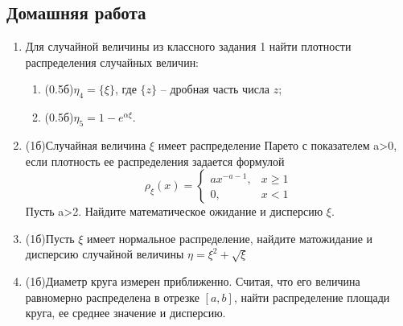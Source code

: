 \documentclass[a4paper, 14pt]{extarticle}
\begin{document}
\subsection*{Домашняя работа}
\begin{enumerate}
\item Для случайной величины из классного задания 1 найти плотности распределения случайных величин:
	\begin{enumerate}
		\item (0.5б)$\eta_4=\{\xi\}$, где $\{z\}$ -- дробная часть числа $z$; 
		\item (0.5б)$\eta_5=1-e^{\alpha\xi}$.
	\end{enumerate}
\item (1б)Случайная величина $\xi$ имеет распределение Парето с показателем a>0, если плотность ее распределения задается формулой
$$\rho_\xi(x) =\left\{
	\begin{array}{cc}
	ax^{-a-1}, & x\geq 1 \\
	0, & x<1
	\end{array}\right.$$
Пусть a>2. Найдите математическое ожидание и дисперсию $\xi$.
\item (1б)Пусть $\xi$ имеет нормальное распределение, найдите матожидание и дисперсию случайной величины $\eta = \xi^2 + \sqrt{\xi}$
\item (1б)Диаметр круга измерен приближенно. Считая, что
	его величина равномерно распределена в отрезке $[a,b]$, найти
	распределение площади круга, ее среднее значение и дисперсию.
\end{enumerate}	
\end{document}
